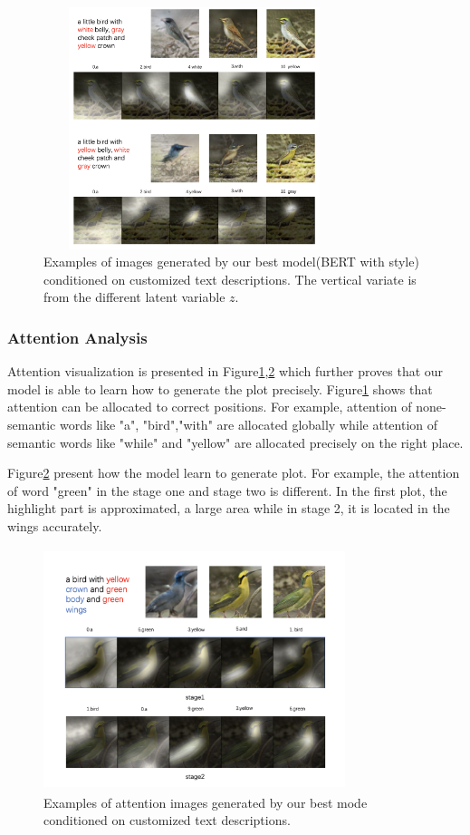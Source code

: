 \documentclass{article}
\begin{document}
\begin{figure}[htbp]

\centering
\includegraphics[width=250pt, height=200pt]{report/fig2.png} 
\caption{Examples of images generated by our best model(BERT with style) conditioned on
customized text descriptions. The vertical variate is from the different latent variable $z$.  }
\label{fig2}
\end{figure}


\subsubsection{Attention Analysis}

Attention visualization is presented in Figure\ref{fig2},\ref{fig3} which further proves that our model is able to learn how to generate the plot precisely.
Figure\ref{fig2} shows that attention can be allocated to correct positions. For example, attention of none-semantic words like "a", "bird","with" are allocated globally while attention of semantic words like "while" and "yellow" are allocated precisely on the right place.

Figure\ref{fig3} present how the model learn to generate plot. For example, the attention of word "green" in the stage one and stage two is different. In the first plot, the highlight part is approximated, a large area while in stage 2, it is located in the wings accurately. 


\begin{figure}
\centering
\includegraphics[width=250pt, height=200pt]{report/fig3.png} 
\caption{Examples of attention images generated by our best mode conditioned on customized text descriptions.   }
\label{fig3}
\end{figure}
\end{document}
